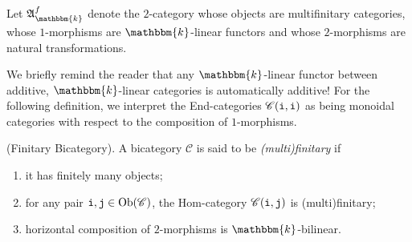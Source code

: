 \noindent\begin{definition} Let $\mathfrak{A}_\mathbbm{k}^f$ denote the $2$-category whose objects are multifinitary categories, whose $1$-morphisms are $\mathbbm{k}$-linear functors and whose $2$-morphisms are natural transformations.\\
\end{definition}


\noindent We briefly remind the reader that any $\mathbbm{k}$-linear functor between additive, $\mathbbm{k}$-linear categories is automatically additive! For the following definition, we interpret the End-categories $\mathscr{C}(\textup{\texttt{i}}, \textup{\texttt{i}})$ as being monoidal categories with respect to the composition of $1$-morphisms.\\

\noindent\begin{definition}\textup{(Finitary Bicategory).} A bicategory $\mathscr{C}$ is said to be {\em (multi)finitary} if
\begin{enumerate}[label=\textup{(\roman*).}, leftmargin=4\parindent]
\item it has finitely many objects;
\item for any pair $\textup{\texttt{i}}, \textup{\texttt{j}} \in \textup{Ob}(\mathscr{C})$, the Hom-category $\mathscr{C}(\textup{\texttt{i}}, \textup{\texttt{j}})$ is (multi)finitary;
\item horizontal composition of $2$-morphisms is %
$\mathbbm{k}$-bilinear.\\%
\end{enumerate}
\end{definition}


